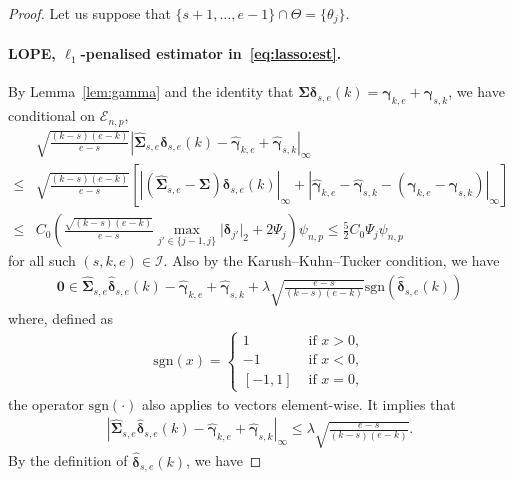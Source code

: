 \documentclass[11pt, a4paper]{article}
\newcommand{\mbf}{\mathbf}
\newcommand{\mc}{\mathcal}
\renewcommand{\l}{\left}
\renewcommand{\r}{\right}
\def\wh{\widehat}
\newcommand{\cp}{\theta}
\newcommand{\Cp}{\Theta}
\newcommand{\nn}{\nonumber}
\theoremstyle{definition}
\theoremstyle{definition}
\theoremstyle{definition}
\theoremstyle{definition}
\theoremstyle{definition}
\theoremstyle{remark}
\theoremstyle{definition}
\theoremstyle{definition}
\theoremstyle{definition}
\begin{document}
\begin{proof} 
Let us suppose that $\{s + 1, \ldots, e - 1\} \cap \Cp = \{ \cp_j \}$. 

	\paragraph{LOPE, $\ell_1$-penalised estimator in~\eqref{eq:lasso:est}.}
	By Lemma~\ref{lem:gamma} and the identity that $\bm\Sigma \bm\delta_{s, e}(k) = \bm\gamma_{k, e} + \bm\gamma_{s, k}$, we have conditional on $\mc E_{n, p}$,
	\begin{align}
	& \sqrt{\frac{(k - s)(e - k)}{e - s}} \l\vert \wh{\bm\Sigma}_{s, e} \bm\delta_{s, e}(k) - \wh{\bm\gamma}_{k, e} + \wh{\bm\gamma}_{s, k} \r\vert_\infty \nn\\
	\le & \sqrt{\frac{(k - s)(e - k)}{e - s}} \l[ \l\vert \l( \wh{\bm\Sigma}_{s, e} - \bm\Sigma \r) \bm\delta_{s, e}(k) \r\vert_\infty +
	\l\vert \wh{\bm\gamma}_{k, e} - \wh{\bm\gamma}_{s, k} - (\bm\gamma_{k, e} - \bm\gamma_{s, k}) \r\vert_\infty
	\r]
	\nn \\
	\le & C_0 \l( \frac{\sqrt{(k - s)(e - k)}}{e - s} \max_{j' \in \{j - 1, j\}} \vert \bm\delta_{j'} \vert_2 + 2 \Psi_j \r) \psi_{n, p} \le \frac{5}{2}C_0 \Psi_j \psi_{n, p}
	\label{eq:feasible}
	\end{align}
	for all such $(s, k, e) \in \mc I$.
	Also by the Karush--Kuhn--Tucker condition, we have 
	\begin{align*}
	\mbf 0 \in \wh{\bm\Sigma}_{s, e} \wh{\bm\delta}_{s, e}(k) - \wh{\bm\gamma}_{k, e} + \wh{\bm\gamma}_{s, k} + \lambda \sqrt{\frac{e - s}{(k - s)(e - k)}} \mathrm{sgn} \l(\wh{\bm\delta}_{s, e}(k) \r)
	\end{align*}
	where, defined as 
	\begin{align*}
	\mathrm{sgn}(x) = \begin{cases}
	1 & \text{ if } x > 0,\\
	-1 & \text{ if } x < 0,\\
	[-1, 1] & \text{ if } x = 0,
	\end{cases}
	\end{align*}
	the operator $\mathrm{sgn}(\cdot)$ also applies to vectors element-wise. It implies that 
	\begin{align}
	\label{eq:lasso:kkt}
	\l\vert \wh{\bm\Sigma}_{s, e} \wh{\bm\delta}_{s, e}(k) - \wh{\bm\gamma}_{k, e} + \wh{\bm\gamma}_{s, k} \r\vert_\infty \le \lambda \sqrt{\frac{e - s}{(k - s)(e - k)}}.
	\end{align}
	By the definition of $\wh{\bm\delta}_{s, e}(k)$, we have

\end{proof}
\end{document}
